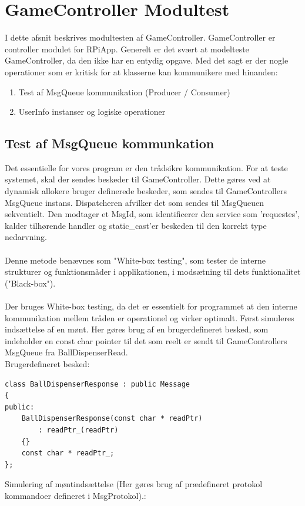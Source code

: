 \documentclass[Modultest/Modultest_main.tex]{subfiles}
\begin{document}
\section{GameController Modultest}\label{sec:test_Game}
I dette afsnit beskrives modultesten af GameController. GameController er controller modulet for RPiApp. Generelt er det svært at modelteste GameController, da den ikke har en entydig opgave. Med det sagt er der nogle operationer som er kritisk for at klasserne kan kommunikere med hinanden: 
\begin{enumerate}
    \item Test af MsgQueue kommunikation (Producer / Consumer)
    \item UserInfo instanser og logiske operationer 
\end{enumerate}

\subsection{Test af MsgQueue kommunkation}
Det essentielle for vores program er den trådsikre kommunikation. For at teste systemet, skal der sendes beskeder til GameController. Dette gøres ved at dynamisk allokere bruger definerede beskeder, som sendes til GameControllers MsgQueue instans. Dispatcheren afvilker det som sendes til MsgQueuen sekventielt. Den modtager et MsgId, som identificerer den service som 'requestes', kalder tilhørende handler og static\_cast'er beskeden til den korrekt type nedarvning. \\\\
Denne metode benævnes som "White-box testing", som tester de interne strukturer og funktionsmåder i applikationen, i modsætning til dets funktionalitet ("Black-box").\\\\
Der bruges White-box testing, da det er essentielt for programmet at den interne kommunikation mellem tråden er operationel og virker optimalt. 
Først simuleres indsættelse af en mønt. Her gøres brug af en brugerdefineret besked, som indeholder en const char pointer til det som reelt er sendt til GameControllers MsgQueue fra BallDispenserRead. \\
Brugerdefineret besked: 
\begin{lstlisting}
class BallDispenserResponse : public Message
{
public:
	BallDispenserResponse(const char * readPtr)
	    : readPtr_(readPtr)
	{}
	const char * readPtr_;
};
\end{lstlisting}
Simulering af møntindsættelse (Her gøres brug af prædefineret protokol kommandoer defineret i MsgProtokol).: 
\end{document}
